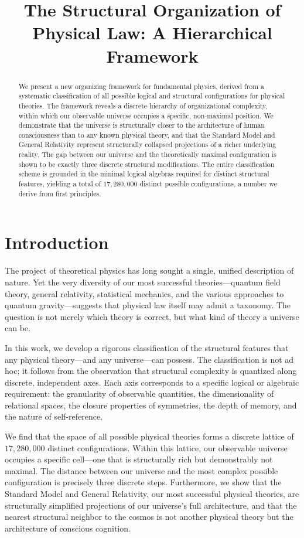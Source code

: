 \documentclass[11pt,a4paper]{article}
\title{The Structural Organization of Physical Law: A Hierarchical Framework}
\author{}
\date{}
\theoremstyle{definition}
\begin{document}
\maketitle

\begin{abstract}
We present a new organizing framework for fundamental physics, derived from a systematic classification of all possible logical and structural configurations for physical theories. The framework reveals a discrete hierarchy of organizational complexity, within which our observable universe occupies a specific, non-maximal position. We demonstrate that the universe is structurally closer to the architecture of human consciousness than to any known physical theory, and that the Standard Model and General Relativity represent structurally collapsed projections of a richer underlying reality. The gap between our universe and the theoretically maximal configuration is shown to be exactly three discrete structural modifications. The entire classification scheme is grounded in the minimal logical algebras required for distinct structural features, yielding a total of \(17,280,000\) distinct possible configurations, a number we derive from first principles.
\end{abstract}

\section{Introduction}

The project of theoretical physics has long sought a single, unified description of nature. Yet the very diversity of our most successful theories---quantum field theory, general relativity, statistical mechanics, and the various approaches to quantum gravity---suggests that physical law itself may admit a taxonomy. The question is not merely which theory is correct, but what kind of theory a universe can be.

In this work, we develop a rigorous classification of the structural features that any physical theory---and any universe---can possess. The classification is not ad hoc; it follows from the observation that structural complexity is quantized along discrete, independent axes. Each axis corresponds to a specific logical or algebraic requirement: the granularity of observable quantities, the dimensionality of relational spaces, the closure properties of symmetries, the depth of memory, and the nature of self-reference.

We find that the space of all possible physical theories forms a discrete lattice of \(17,280,000\) distinct configurations. Within this lattice, our observable universe occupies a specific cell---one that is structurally rich but demonstrably not maximal. The distance between our universe and the most complex possible configuration is precisely three discrete steps. Furthermore, we show that the Standard Model and General Relativity, our most successful physical theories, are structurally simplified projections of our universe's full architecture, and that the nearest structural neighbor to the cosmos is not another physical theory but the architecture of conscious cognition.
\end{document}
